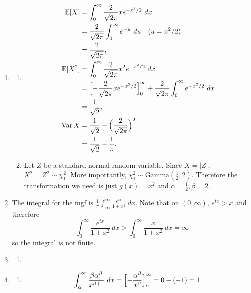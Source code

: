 \documentclass{article}
\DeclareMathOperator{\var}{Var}
\begin{document}
\begin{enumerate}
    \item \begin{enumerate}
        \item \begin{align*}
            \mathbb{E}[X]
            &= \int_{0}^{\infty} \frac{2}{\sqrt{2\pi}} xe^{-x^2 / 2} \ dx \\
            &= \frac{2}{\sqrt{2\pi}} \int_{0}^{\infty} e^{-u} \ du \quad (u = x^2 / 2) \\
            &= \frac{2}{\sqrt{2\pi}}, \\
            \mathbb{E}[X^2]
            &= \int_{0}^{\infty} \frac{2}{\sqrt{2\pi}} x^2 e^{-x^2 / 2} \ dx \\
            &= \Bigl[ -\frac{2}{\sqrt{2\pi}} xe^{-x^2 / 2} \Bigr]_{0}^{\infty} 
            + \frac{2}{\sqrt{2\pi}} \int_{0}^{\infty} e^{-x^2 / 2} \ dx \\
            &= \frac{1}{\sqrt{2}}, \\
            \var{X}
            &= \frac{1}{\sqrt{2}} - \Bigl( \frac{2}{\sqrt{2\pi}} \Bigr)^2 \\
            &= \frac{1}{\sqrt{2}} - \frac{1}{\pi}.
        \end{align*}

        \item Let $Z$ be a standard normal random variable. Since $X = |Z|$, $X^2 = Z^2 \sim \chi_{1}^2$. 
        More importantly, $\chi_{1}^2 \sim \text{Gamma}(\frac{1}{2}, 2)$. Therefore the transformation we 
        need is just $g(x) = x^2$ and $\alpha = \frac{1}{2}, \beta = 2$.
    \end{enumerate}

    \item The integral for the mgf is $\frac{1}{\pi} \int_{\infty}^{\infty} \frac{e^{tx}}{1 + x^2} \ dx$. 
    Note that on $(0, \infty)$, $e^{tx} > x$ and therefore 
    \[ \int_{0}^{\infty} \frac{e^{tx}}{1 + x^2} \ dx > \int_{0}^{\infty} \frac{x}{1 + x^2} \ dx = \infty \]
    so the integral is not finite.

    \item \begin{enumerate}
        \item 
    \end{enumerate}

    \item \begin{enumerate}
        \item \[ 
        \int_{\alpha}^{\infty} \frac{\beta \alpha^{\beta}}{x^{\beta + 1}} \ dx 
        = \Bigl[ -\frac{\alpha^{\beta}}{x^{\beta}} \Bigr]_{\alpha}^{\infty} = 0 - (-1) = 1. 
        \]


\end{enumerate}
\end{enumerate}
\end{document}

